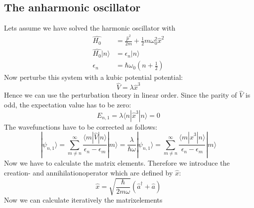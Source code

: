 \subsection{The anharmonic oscillator}
Lets assume we have solved the harmonic oscillator with 
\begin{align}
    \hat{H_0} &= \frac{\hat{p}^2}{2m} 
    + \frac{1}{2} m \omega_0^2\hat{x}^2 \\
    \hat{H_0}|n \rangle &= \epsilon_n |n \rangle \\
    \epsilon_n &= \hbar \omega_0 \left (n+ \frac{1}{2} \right)
\end{align}
Now perturbe this system with a kubic potential potential:
\begin{equation}
\hat{V} =\lambda \hat{x}^3
\end{equation}
Hence we can use the perturbation theory in linear order.
Since the parity of $\hat{V}$ is odd, the expectation value has 
to be zero:
\begin{equation}
    E_{n,1} = \lambda \langle n | \hat{x}^3 | n \rangle = 0 
\end{equation}
The wavefunctions have to be corrected as follows:
\begin{equation}
    |\psi_{n,1} \rangle = \sum_{m\neq n}^{\infty}
    \frac{\langle m |\hat{V}|n \rangle}{\epsilon_n - \epsilon_m}  
    |m \rangle 
    = \frac{\lambda}{\hbar \omega}
    |\psi_{n,1} \rangle = \sum_{m\neq n}^{\infty}
    \frac{\langle m |\hat{x}^3|n \rangle}{\epsilon_n - \epsilon_m}  
    |m \rangle 
\end{equation}
Now we have to calculate the matrix elements. Therefore we
introduce the creation- and annihilationoperator 
which are defined by $\hat{x}$:
\begin{equation}
    \hat{x} = \sqrt{\frac{\hbar}{2m\omega}}(\hat{a}^\dagger +
        \hat{a})
\end{equation} 
Now we can calculate iteratively the matrixelements
